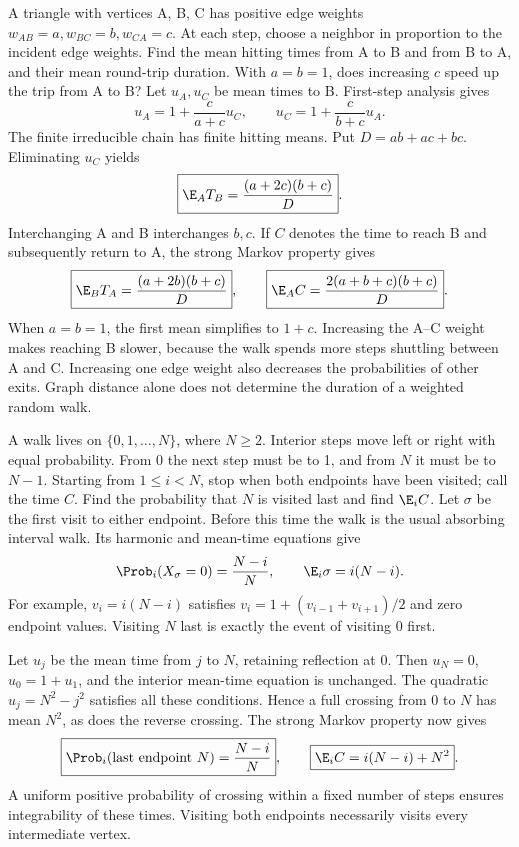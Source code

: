 A triangle with vertices A, B, C has positive edge weights $w_{AB}=a,w_{BC}=b,w_{CA}=c$. At each step, choose a neighbor in proportion to the incident edge weights. Find the mean hitting times from A to B and from B to A, and their mean round-trip duration. With $a=b=1$, does increasing $c$ speed up the trip from A to B?
\solution Let $u_A,u_C$ be mean times to B. First-step analysis gives
\[
 u_A=1+\frac c{a+c}u_C,\qquad
 u_C=1+\frac c{b+c}u_A.
\]
The finite irreducible chain has finite hitting means. Put $D=ab+ac+bc$. Eliminating $u_C$ yields
\[
 \boxed{\E_A T_B=\frac{(a+2c)(b+c)}D}.
\]
Interchanging A and B interchanges $b,c$. If $C$ denotes the time to reach B and subsequently return to A, the strong Markov property gives
\[
 \boxed{\E_B T_A=\frac{(a+2b)(b+c)}D},\qquad
 \boxed{\E_A C=\frac{2(a+b+c)(b+c)}D}.
\]
When $a=b=1$, the first mean simplifies to $\boxed{1+c}$. Increasing the A--C weight makes reaching B slower, because the walk spends more steps shuttling between A and C.
\insight Increasing one edge weight also decreases the probabilities of other exits. Graph distance alone does not determine the duration of a weighted random walk.

A walk lives on $\{0,1,\ldots,N\}$, where $N\ge2$. Interior steps move left or right with equal probability. From 0 the next step must be to 1, and from $N$ it must be to $N-1$. Starting from $1\le i<N$, stop when both endpoints have been visited; call the time $C$. Find the probability that $N$ is visited last and find $\E_iC$.
\solution Let $\sigma$ be the first visit to either endpoint. Before this time the walk is the usual absorbing interval walk. Its harmonic and mean-time equations give
\[
 \Prob_i(X_\sigma=0)=\frac{N-i}{N},\qquad
 \E_i\sigma=i(N-i).
\]
For example, $v_i=i(N-i)$ satisfies $v_i=1+(v_{i-1}+v_{i+1})/2$ and zero endpoint values. Visiting $N$ last is exactly the event of visiting 0 first.

Let $u_j$ be the mean time from $j$ to $N$, retaining reflection at 0. Then $u_N=0$, $u_0=1+u_1$, and the interior mean-time equation is unchanged. The quadratic $u_j=N^2-j^2$ satisfies all these conditions. Hence a full crossing from 0 to $N$ has mean $N^2$, as does the reverse crossing. The strong Markov property now gives
\[
 \boxed{\Prob_i(\text{last endpoint }N)=\frac{N-i}{N}},\qquad
 \boxed{\E_i C=i(N-i)+N^2}.
\]
A uniform positive probability of crossing within a fixed number of steps ensures integrability of these times. Visiting both endpoints necessarily visits every intermediate vertex.

